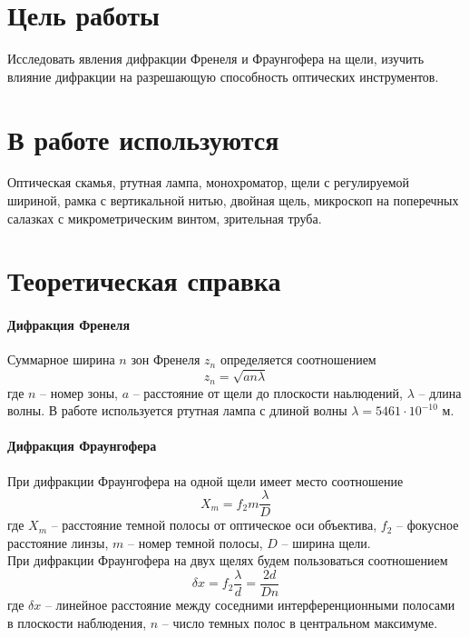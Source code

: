 \section*{Цель работы}
Исследовать явления дифракции Френеля и Фраунгофера на щели, изучить влияние дифракции на разрешающую способность оптических инструментов.


\section*{В работе используются}
Оптическая скамья, ртутная лампа, монохроматор, щели с регулируемой шириной, рамка с вертикальной нитью, двойная щель, микроскоп на поперечных салазках с микрометрическим винтом, зрительная труба.


\section*{Теоретическая справка}
\paragraph{Дифракция Френеля}
Суммарное ширина $n$ зон Френеля $z_n$ определяется соотношением
\begin{equation}
    z_n = \sqrt{an\lambda}
\end{equation}
где $n$ -- номер зоны, $a$ -- расстояние от щели до плоскости наьлюдений, $\lambda$ -- длина волны. В работе используется ртутная лампа с длиной волны $\lambda = 5461 \cdot 10^{-10}$ м.

\paragraph{Дифракция Фраунгофера}
При дифракции Фраунгофера на одной щели имеет место соотношение
\begin{equation}
    X_m = f_2 m \frac{\lambda}{D}
\end{equation}
где $X_m$ -- расстояние темной полосы от оптическое оси объектива, $f_2$ -- фокусное расстояние линзы, $m$ -- номер темной полосы, $D$ -- ширина щели. \\
При дифракции Фраунгофера на двух щелях будем пользоваться соотношением
\begin{equation}
    \delta x = f_2 \frac{\lambda}{d} = \frac{2d}{Dn}
\end{equation}
где $\delta x$ -- линейное расстояние между соседними интерференционными полосами в плоскости наблюдения, $n$ -- число темных полос в центральном максимуме.
